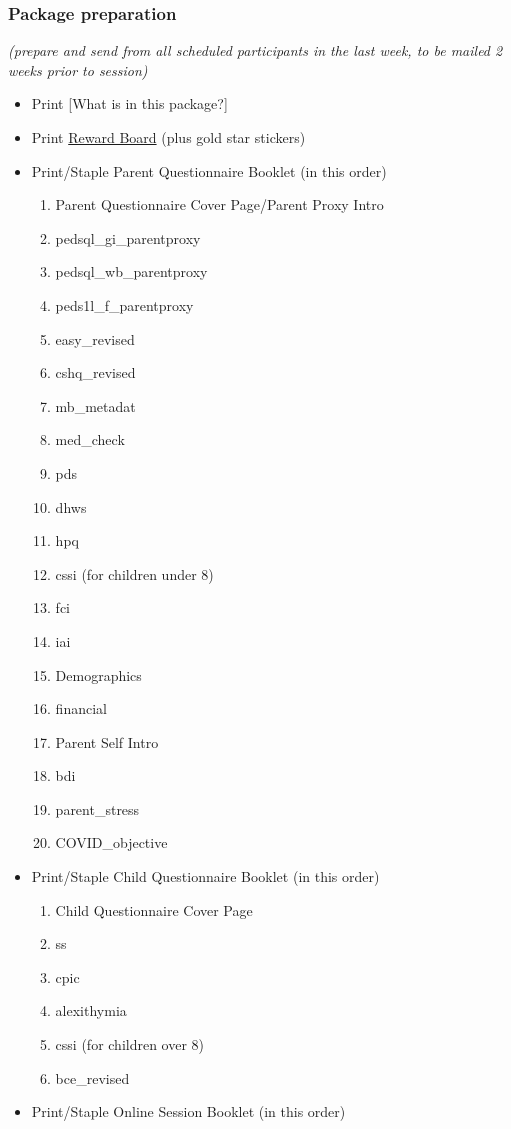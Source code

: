 \documentclass[]{book}
\providecommand{\tightlist}{%
  \setlength{\itemsep}{0pt}\setlength{\parskip}{0pt}}
\begin{document}
\hypertarget{package-preparation}{%
\subsubsection{Package preparation}\label{package-preparation}}

\emph{(prepare and send from all scheduled participants in the last week, to be mailed 2 weeks prior to session)}

\begin{itemize}
\tightlist
\item
  Print {[}What is in this package?{]}
\item
  Print \href{https://ucla.app.box.com/file/668504120930}{Reward Board} (plus gold star stickers)
\item
  Print/Staple Parent Questionnaire Booklet (in this order)

  \begin{enumerate}
  \def\labelenumi{\arabic{enumi}.}
  \tightlist
  \item
    Parent Questionnaire Cover Page/Parent Proxy Intro
  \item
    pedsql\_gi\_parentproxy
  \item
    pedsql\_wb\_parentproxy
  \item
    peds1l\_f\_parentproxy
  \item
    easy\_revised
  \item
    cshq\_revised
  \item
    mb\_metadat
  \item
    med\_check
  \item
    pds
  \item
    dhws
  \item
    hpq
  \item
    cssi (for children under 8)
  \item
    fci
  \item
    iai
  \item
    Demographics
  \item
    financial
  \item
    Parent Self Intro
  \item
    bdi
  \item
    parent\_stress
  \item
    COVID\_objective
  \end{enumerate}
\item
  Print/Staple Child Questionnaire Booklet (in this order)

  \begin{enumerate}
  \def\labelenumi{\arabic{enumi}.}
  \tightlist
  \item
    Child Questionnaire Cover Page
  \item
    ss
  \item
    cpic
  \item
    alexithymia
  \item
    cssi (for children over 8)
  \item
    bce\_revised
  \end{enumerate}
\item
  Print/Staple Online Session Booklet (in this order)


\end{itemize}
\end{document}
